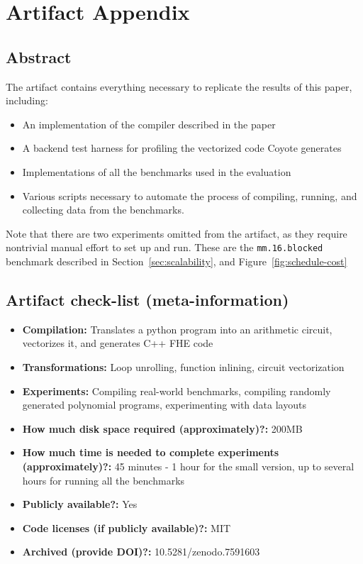 \section{Artifact Appendix}

\subsection{Abstract}

The artifact contains everything necessary to replicate the results of this paper, including:
\begin{itemize}
    \item An implementation of the compiler described in the paper
    \item A backend test harness for profiling the vectorized code Coyote generates
    \item Implementations of all the benchmarks used in the evaluation
    \item Various scripts necessary to automate the process of compiling, running, and collecting data from the benchmarks.
\end{itemize}

Note that there are two experiments omitted from the artifact, as they require nontrivial manual effort to set up and run. These are the {\tt mm.16.blocked} benchmark described in Section~\ref{sec:scalability}, and Figure~\ref{fig:schedule-cost}

\subsection{Artifact check-list (meta-information)}

{\small
\begin{itemize}
  \item {\bf Compilation: } Translates a python program into an arithmetic circuit, vectorizes it, and generates C++ FHE code
  \item {\bf Transformations: } Loop unrolling, function inlining, circuit vectorization
  \item {\bf Experiments: } Compiling real-world benchmarks, compiling randomly generated polynomial programs, experimenting with data layouts
  \item {\bf How much disk space required (approximately)?: } 200MB
  \item {\bf How much time is needed to complete experiments (approximately)?: } 45 minutes - 1 hour for the small version, up to several hours for running all the benchmarks
  \item {\bf Publicly available?: } Yes
  \item {\bf Code licenses (if publicly available)?: } MIT
  \item {\bf Archived (provide DOI)?: } 10.5281/zenodo.7591603
  
\end{itemize}
}

